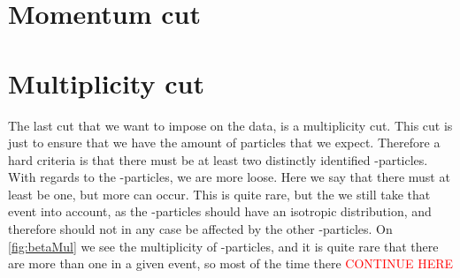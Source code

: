 \section{Momentum cut}

\section{Multiplicity cut}
The last cut that we want to impose on the data, is a multiplicity cut. This cut is just to ensure that we have the amount of particles that we expect. 
Therefore a hard criteria is that there must be at least two distinctly identified \al-particles. \\

With regards to the \be-particles, we are more loose. Here we say that there must at least be one, but more can occur. This is quite rare, but the we still take that event into account, as the \be-particles should have an isotropic distribution, and therefore should not in any case be affected by the other \al-particles. On \cref{fig:betaMul} we see the multiplicity of \be-particles, and it is quite rare that there are more than one in a given event, so most of the time there \textcolor{red}{CONTINUE HERE}